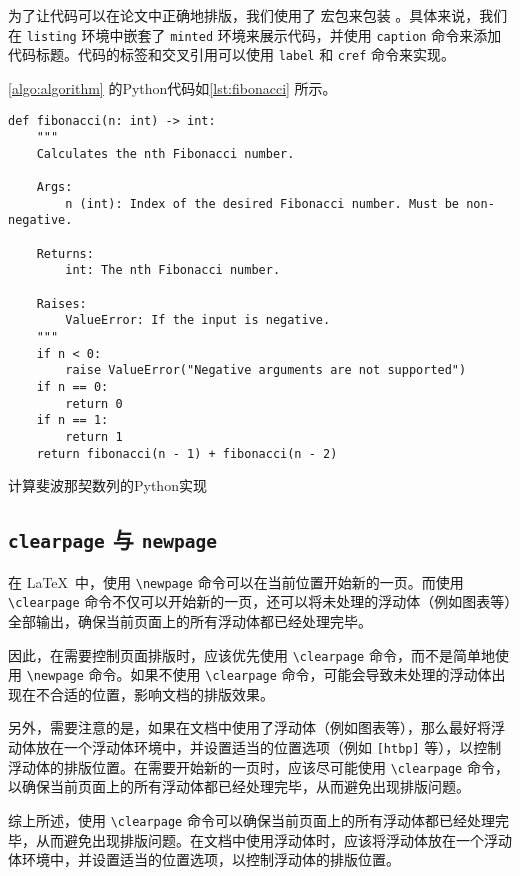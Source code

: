 为了让代码可以在论文中正确地排版，我们使用了  宏包来包装 。具体来说，我们在 \texttt{listing} 环境中嵌套了 \texttt{minted} 环境来展示代码，并使用 \texttt{caption} 命令来添加代码标题。代码的标签和交叉引用可以使用 \texttt{label} 和 \texttt{cref} 命令来实现。

\cref{algo:algorithm} 的Python代码如\cref{lst:fibonacci} 所示。



\begin{listing}[htbp]
  \begin{verbatim}
def fibonacci(n: int) -> int:
    """
    Calculates the nth Fibonacci number.

    Args:
        n (int): Index of the desired Fibonacci number. Must be non-negative.

    Returns:
        int: The nth Fibonacci number.

    Raises:
        ValueError: If the input is negative.
    """
    if n < 0:
        raise ValueError("Negative arguments are not supported")
    if n == 0:
        return 0
    if n == 1:
        return 1
    return fibonacci(n - 1) + fibonacci(n - 2)
  \end{verbatim}
  \caption{计算斐波那契数列的Python实现}\label{lst:fibonacci}
\end{listing}

\subsection{\texttt{clearpage} 与 \texttt{newpage}}

在 \LaTeX\ 中，使用 \verb|\newpage| 命令可以在当前位置开始新的一页。而使用 \verb|\clearpage| 命令不仅可以开始新的一页，还可以将未处理的浮动体（例如图表等）全部输出，确保当前页面上的所有浮动体都已经处理完毕。

因此，在需要控制页面排版时，应该优先使用 \verb|\clearpage| 命令，而不是简单地使用 \verb|\newpage| 命令。如果不使用 \verb|\clearpage| 命令，可能会导致未处理的浮动体出现在不合适的位置，影响文档的排版效果。

另外，需要注意的是，如果在文档中使用了浮动体（例如图表等），那么最好将浮动体放在一个浮动体环境中，并设置适当的位置选项（例如 \verb|[htbp]| 等），以控制浮动体的排版位置。在需要开始新的一页时，应该尽可能使用 \verb|\clearpage| 命令，以确保当前页面上的所有浮动体都已经处理完毕，从而避免出现排版问题。

综上所述，使用 \verb|\clearpage| 命令可以确保当前页面上的所有浮动体都已经处理完毕，从而避免出现排版问题。在文档中使用浮动体时，应该将浮动体放在一个浮动体环境中，并设置适当的位置选项，以控制浮动体的排版位置。